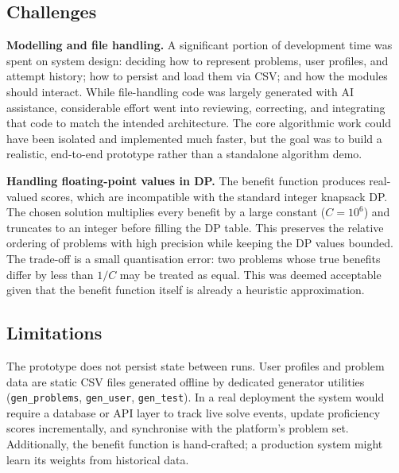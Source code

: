 \documentclass{article}
\begin{document}
\subsection{Challenges}

\textbf{Modelling and file handling.} A significant portion of
development time was spent on system design: deciding how to represent
problems, user profiles, and attempt history; how to persist and load
them via CSV; and how the modules should interact. While file-handling
code was largely generated with AI assistance, considerable effort went
into reviewing, correcting, and integrating that code to match the
intended architecture. The core algorithmic work could have been
isolated and implemented much faster, but the goal was to build a
realistic, end-to-end prototype rather than a standalone algorithm demo.

\textbf{Handling floating-point values in DP.} The benefit function
produces real-valued scores, which are incompatible with the standard
integer knapsack DP. The chosen solution multiplies every benefit by a
large constant ($C = 10^6$) and truncates to an integer before filling
the DP table. This preserves the relative ordering of problems with
high precision while keeping the DP values bounded. The trade-off is a
small quantisation error: two problems whose true benefits differ by
less than $1/C$ may be treated as equal. This was deemed acceptable
given that the benefit function itself is already a heuristic
approximation.

\subsection{Limitations}

The prototype does not persist state between runs. User profiles and
problem data are static CSV files generated offline by dedicated
generator utilities (\texttt{gen\_problems}, \texttt{gen\_user},
\texttt{gen\_test}). In a real deployment the system would require a
database or API layer to track live solve events, update proficiency
scores incrementally, and synchronise with the platform's problem set.
Additionally, the benefit function is hand-crafted; a production system
might learn its weights from historical data.
\end{document}
